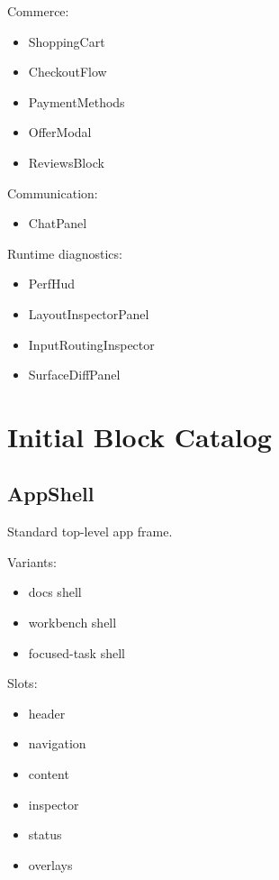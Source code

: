 Commerce:

\begin{itemize}
\tightlist
\item
  ShoppingCart
\item
  CheckoutFlow
\item
  PaymentMethods
\item
  OfferModal
\item
  ReviewsBlock
\end{itemize}

Communication:

\begin{itemize}
\tightlist
\item
  ChatPanel
\end{itemize}

Runtime diagnostics:

\begin{itemize}
\tightlist
\item
  PerfHud
\item
  LayoutInspectorPanel
\item
  InputRoutingInspector
\item
  SurfaceDiffPanel
\end{itemize}

\section{Initial Block Catalog}\label{record-128-initial-block-catalog}

\subsection{AppShell}\label{record-128-appshell}

Standard top-level app frame.

Variants:

\begin{itemize}
\tightlist
\item
  docs shell
\item
  workbench shell
\item
  focused-task shell
\end{itemize}

Slots:

\begin{itemize}
\tightlist
\item
  header
\item
  navigation
\item
  content
\item
  inspector
\item
  status
\item
  overlays
\end{itemize}

